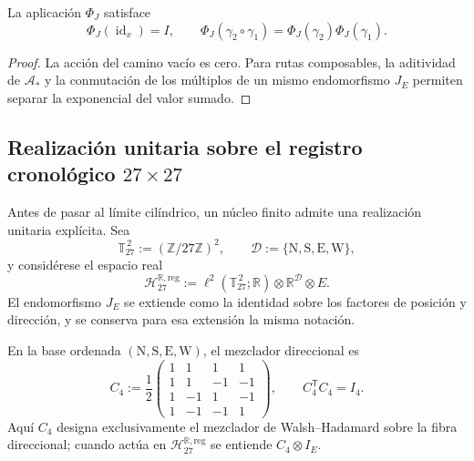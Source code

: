 \begin{proposition}
\label{prop:fase-interna-functor-rev2}
La aplicación \(\Phi_J\) satisface
\[
 \Phi_J(\operatorname{id}_x)=I,
 \qquad
 \Phi_J(\gamma_2\circ\gamma_1)
 =\Phi_J(\gamma_2)\Phi_J(\gamma_1).
\]
\end{proposition}

\begin{proof}
La acción del camino vacío es cero. Para rutas composables, la aditividad de
\(\mathcal A_*\) y la conmutación de los múltiplos de un mismo endomorfismo
\(J_E\) permiten separar la exponencial del valor sumado.
\end{proof}

\subsection{Realización unitaria sobre el registro cronológico
\texorpdfstring{\(27\times27\)}{27 x 27}}
\label{sec:realizacion-unitaria-registro-27-rev3}

Antes de pasar al límite cilíndrico, un núcleo finito admite una realización
unitaria explícita. Sea
\[
 \mathbb T_{27}^{\,2}:=(\mathbb Z/27\mathbb Z)^2,
 \qquad
 \mathcal D:=\{\mathrm N,\mathrm S,\mathrm E,\mathrm W\},
\]
y considérese el espacio real
\[
 \mathcal H_{27}^{\mathbb R,\mathrm{reg}}
 :=\ell^2(\mathbb T_{27}^{\,2};\mathbb R)
   \otimes\mathbb R^{\mathcal D}\otimes E.
\]
El endomorfismo \(J_E\) se extiende como la identidad sobre los factores de
posición y dirección, y se conserva para esa extensión la misma notación.

En la base ordenada
\((\mathrm N,\mathrm S,\mathrm E,\mathrm W)\), el mezclador direccional es
\begin{equation}
 C_4:=\frac12
 \begin{pmatrix}
  1&1&1&1\\
  1&1&-1&-1\\
  1&-1&1&-1\\
  1&-1&-1&1
 \end{pmatrix},
 \qquad C_4^{\mathsf T}C_4=I_4.
 \label{eq:mezclador-walsh-registro-27-rev3}
\end{equation}
Aquí \(C_4\) designa exclusivamente el mezclador de Walsh--Hadamard sobre la
fibra direccional; cuando actúa en
\(\mathcal H_{27}^{\mathbb R,\mathrm{reg}}\) se entiende
\(C_4\otimes I_E\).

